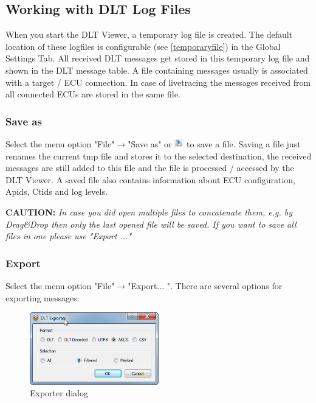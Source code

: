 \documentclass[a4paper,11pt]{article}
\newcommand{\caution}[1]{\begin{ibox} \textbf{CAUTION:} \emph{#1} \end{ibox}}
\begin{document}
\pagebreak

\subsection{Working with DLT Log Files}
When you start the DLT Viewer, a temporary log file is created. The default location of these logfiles is configurable (see \autoref{temporaryfile}) in the Global Settings Tab.
All received DLT messages get stored in this temporary log file and shown in the DLT message table.
A file containing messages usually is associated with a target / ECU connection. In case of livetracing the messages received from all connected
ECUs are stored in the same file.

\subsubsection{Save as}
Select the menu option "File"\ensuremath{\rightarrow}"Save as" or \includegraphics[width=0.03\textwidth]{images/saveas_icon.png} to save a file.
Saving a file just renames the current tmp file and stores it to the selected destination, the received messages are still
added to this file and the file is processed / accessed by the DLT Viewer. A saved file also contains information about ECU configuration, Apids, Ctids
and log levels.

\caution{In case you did open multiple files to concatenate them, e.g. by Drag\&Drop then only the last opened file will be saved. If you want to save all files in one please use "Export ..."}

\subsubsection{Export}
Select the menu option "File"\ensuremath{\rightarrow}"Export... ". 
There are several options for exporting messages:
\vspace{0.3cm}

\begin{figure}[H]
 \centering
   \includegraphics[width=0.5\textwidth]{images/DLTExporter.png}
 \caption{Exporter dialog}
 \label{fig:exportdialog}
\end{figure}
\end{document}
